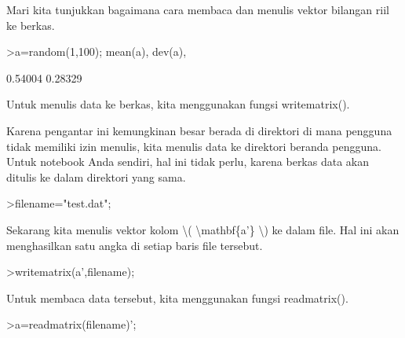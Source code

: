 \documentclass[12pt,arial,letterpaper]{book}
\begin{document}
\begin{eulercomment}
\begin{eulercomment}
\begin{eulercomment}
\begin{eulercomment}
\begin{eulercomment}
\begin{eulercomment}
\begin{eulercomment}
\begin{eulercomment}
\begin{eulercomment}
\begin{eulercomment}
\begin{eulercomment}
\begin{eulercomment}
\begin{eulercomment}
\begin{eulercomment}
\begin{eulercomment}
\begin{eulercomment}
\begin{eulercomment}
\begin{eulercomment}
\begin{eulercomment}
\begin{eulercomment}
\begin{eulercomment}
\begin{eulercomment}
\begin{eulercomment}
\begin{eulercomment}
\begin{eulercomment}
\begin{eulercomment}
\begin{eulercomment}
\begin{eulercomment}
\begin{eulercomment}
\begin{eulercomment}
\begin{eulercomment}
\begin{eulercomment}
\begin{eulercomment}
\begin{eulercomment}
\begin{eulercomment}
\begin{eulercomment}
\begin{eulercomment}
\begin{eulercomment}
\begin{eulercomment}
Mari kita tunjukkan bagaimana cara membaca dan menulis vektor bilangan
riil ke berkas.
\end{eulercomment}
\begin{eulerprompt}
>a=random(1,100); mean(a), dev(a),
\end{eulerprompt}
\begin{euleroutput}
  0.54004
  0.28329
\end{euleroutput}
\begin{eulercomment}
Untuk menulis data ke berkas, kita menggunakan fungsi writematrix().

Karena pengantar ini kemungkinan besar berada di direktori di mana
pengguna tidak memiliki izin menulis, kita menulis data ke direktori
beranda pengguna. Untuk notebook Anda sendiri, hal ini tidak perlu,
karena berkas data akan ditulis ke dalam direktori yang sama.
\end{eulercomment}
\begin{eulerprompt}
>filename="test.dat";
\end{eulerprompt}
\begin{eulercomment}
Sekarang kita menulis vektor kolom \textbackslash{}( \textbackslash{}mathbf\{a'\} \textbackslash{}) ke dalam file.
Hal ini akan menghasilkan satu angka di setiap baris file tersebut.
\end{eulercomment}
\begin{eulerprompt}
>writematrix(a',filename);
\end{eulerprompt}
\begin{eulercomment}
Untuk membaca data tersebut, kita menggunakan fungsi readmatrix().
\end{eulercomment}
\begin{eulerprompt}
>a=readmatrix(filename)';
\end{eulerprompt}

\end{eulercomment}
\end{eulercomment}
\end{eulercomment}
\end{eulercomment}
\end{eulercomment}
\end{eulercomment}
\end{eulercomment}
\end{eulercomment}
\end{eulercomment}
\end{eulercomment}
\end{eulercomment}
\end{eulercomment}
\end{eulercomment}
\end{eulercomment}
\end{eulercomment}
\end{eulercomment}
\end{eulercomment}
\end{eulercomment}
\end{eulercomment}
\end{eulercomment}
\end{eulercomment}
\end{eulercomment}
\end{eulercomment}
\end{eulercomment}
\end{eulercomment}
\end{eulercomment}
\end{eulercomment}
\end{eulercomment}
\end{eulercomment}
\end{eulercomment}
\end{eulercomment}
\end{eulercomment}
\end{eulercomment}
\end{eulercomment}
\end{eulercomment}
\end{eulercomment}
\end{eulercomment}
\end{eulercomment}
\end{document}
